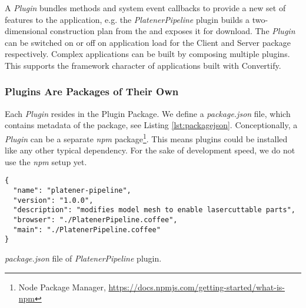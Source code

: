\documentclass[../ClassicThesis.tex]{subfiles}
\begin{document}
A \emph{Plugin} bundles methods and system event callbacks to provide a new set
of features to the application, e.g. the \emph{PlatenerPipeline} plugin builds a
two-dimensional construction plan from the {\threedmodel} and exposes it for
download. The \emph{Plugin} can be switched on or off on application load for
the Client and Server package respectively. Complex applications can be built by
composing multiple plugins. This supports the framework character of
applications built with Convertify.






\subsubsection{Plugins Are Packages of Their Own}

Each \emph{Plugin} resides in the Plugin Package. We define a
\emph{package.json} file, which contains metadata of the package, see Listing
\ref{lst:packagejson}. Conceptionally, a \emph{Plugin} can be a separate
\emph{npm} package\footnote{Node Package Manager,
  \url{https://docs.npmjs.com/getting-started/what-is-npm}}. This means plugins
could be installed like any other typical dependency. For the sake of
development speed, we do not use the \emph{npm} setup yet. 

\begin{listing}[ht]
\begin{verbatim}
{
  "name": "platener-pipeline",
  "version": "1.0.0",
  "description": "modifies model mesh to enable lasercuttable parts",
  "browser": "./PlatenerPipeline.coffee",
  "main": "./PlatenerPipeline.coffee"
}
\end{verbatim}
\caption{\emph{package.json} file of \emph{PlatenerPipeline} plugin.}
\label{lst:packagejson}
\end{listing}
\end{document}
